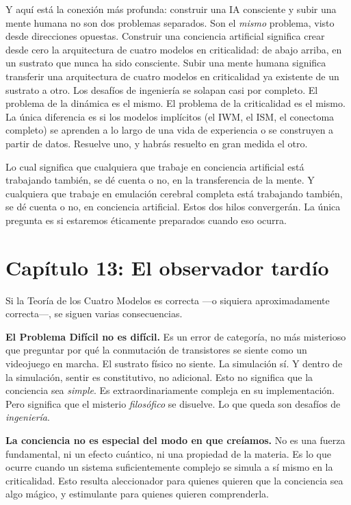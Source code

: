 \documentclass[11pt, twoside, openright]{book}
\begin{document}
Y aquí está la conexión más profunda: construir una IA consciente y subir una mente humana no son dos problemas separados. Son el \textit{mismo} problema, visto desde direcciones opuestas. Construir una conciencia artificial significa crear desde cero la arquitectura de cuatro modelos en criticalidad: de abajo arriba, en un sustrato que nunca ha sido consciente. Subir una mente humana significa transferir una arquitectura de cuatro modelos en criticalidad ya existente de un sustrato a otro. Los desafíos de ingeniería se solapan casi por completo. El problema de la dinámica es el mismo. El problema de la criticalidad es el mismo. La única diferencia es si los modelos implícitos (el IWM, el ISM, el conectoma completo) se aprenden a lo largo de una vida de experiencia o se construyen a partir de datos. Resuelve uno, y habrás resuelto en gran medida el otro.

Lo cual significa que cualquiera que trabaje en conciencia artificial está trabajando también, se dé cuenta o no, en la transferencia de la mente. Y cualquiera que trabaje en emulación cerebral completa está trabajando también, se dé cuenta o no, en conciencia artificial. Estos dos hilos convergerán. La única pregunta es si estaremos éticamente preparados cuando eso ocurra.


\chapter*{Capítulo 13: El observador tardío}

Si la Teoría de los Cuatro Modelos es correcta ---o siquiera aproximadamente correcta---, se siguen varias consecuencias.

\textbf{El Problema Difícil no es difícil.} Es un error de categoría, no más misterioso que preguntar por qué la conmutación de transistores se siente como un videojuego en marcha. El sustrato físico no siente. La simulación sí. Y dentro de la simulación, sentir es constitutivo, no adicional. Esto no significa que la conciencia sea \textit{simple}. Es extraordinariamente compleja en su implementación. Pero significa que el misterio \textit{filosófico} se disuelve. Lo que queda son desafíos de \textit{ingeniería}.

\textbf{La conciencia no es especial del modo en que creíamos.} No es una fuerza fundamental, ni un efecto cuántico, ni una propiedad de la materia. Es lo que ocurre cuando un sistema suficientemente complejo se simula a sí mismo en la criticalidad. Esto resulta aleccionador para quienes quieren que la conciencia sea algo mágico, y estimulante para quienes quieren comprenderla.
\end{document}
